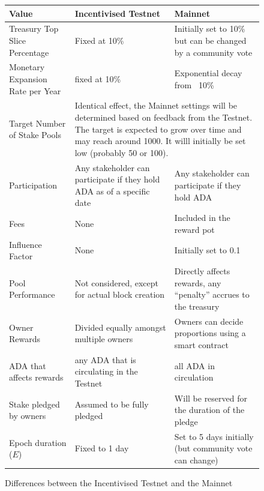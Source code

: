 \documentclass[11pt,a4paper,dvipsnames,twosided]{article}
\begin{document}
\begin{figure}[h!]
\begin{center}
\begin{tabular}{||l|p{4cm}|p{4cm}||}
  \hline\hline
  \textbf{Value} & \textbf{Incentivised Testnet} & \textbf{Mainnet}
                                              \\\hline
Treasury Top Slice Percentage
& Fixed at 10\%
& Initially set to 10\% but can be changed by a community vote
                                              \\\hline
Monetary Expansion Rate per Year
& fixed at 10\%
& Exponential decay from ~10\%
                                              \\\hline
 Target Number of Stake Pools
                 &
\multicolumn{2}{|p{8cm}||}{
Identical effect, the Mainnet settings will be determined based on feedback from the Testnet.
The target is expected to grow over time and may reach around 1000.
It willl initially be set low (probably 50 or 100).}
                                              \\\hline
Participation
& Any stakeholder can participate if they hold ADA as of a specific date
& Any stakeholder can participate if they hold ADA
                                              \\\hline
Fees
& None
& Included in the reward pot
                                              \\\hline
Influence Factor
& None
& Initially set to 0.1
                                              \\\hline
Pool Performance
& Not considered, except for actual block creation
& Directly affects rewards, any ``penalty'' accrues to the treasury
                                              \\\hline
Owner Rewards
& Divided equally amongst multiple owners
& Owners can decide proportions using a smart contract
                                              \\\hline
ADA that affects rewards
& any ADA that is circulating in the Testnet
& all ADA in circulation
                                              \\\hline
Stake pledged by owners
& Assumed to be fully pledged
& Will be reserved for the duration of the pledge
                                              \\\hline
Epoch duration ($E$)
& Fixed to 1 day
& Set to 5 days initially (but community vote can change)
                                              \\\hline
\hline
\end{tabular}
\end{center}
\caption{Differences between the Incentivised Testnet and the Mainnet}
\end{figure}



\end{document}
